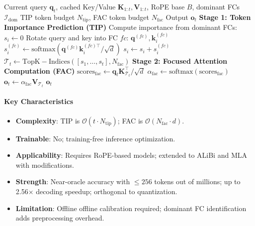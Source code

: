 \begin{algorithm}[H]
\caption{FASA: Frequency-Aware Sparse Attention (Inference-Time)}
\begin{algorithmic}[1]
\Require Current query $\mathbf{q}_t$, cached Key/Value $\mathbf{K}_{1:t}, \mathbf{V}_{1:t}$, RoPE base $B$, dominant FCs $\mathcal{I}_{\text{dom}}$
\Require TIP token budget $N_{\text{tip}}$, FAC token budget $N_{\text{fac}}$
\Ensure Output $\mathbf{o}_t$
\State \textbf{Stage 1: Token Importance Prediction (TIP)}
        \State Compute importance from dominant FCs: $s_i \gets 0$
            \State Rotate query and key into FC $fc$: $\mathbf{q}^{(fc)}, \mathbf{k}_i^{(fc)}$
            \State $s_i^{(fc)} \gets \text{softmax}(\mathbf{q}^{(fc)} \mathbf{k}_i^{(fc)\top} / \sqrt{d}) $
            \State $s_i \gets s_i + s_i^{(fc)}$
        \EndFor
    \EndFor
    \State $\mathcal{T}_t \gets \mathrm{TopK-Indices}([s_1, \ldots, s_t], N_{\text{fac}})$ 
\EndFor
\State \textbf{Stage 2: Focused Attention Computation (FAC)}
\State $\text{scores}_{\text{fac}} \gets \mathbf{q}_t \mathbf{K}_{\mathcal{T}_t}^\top / \sqrt{d}$ 
\State $\alpha_{\text{fac}} \gets \text{softmax}(\text{scores}_{\text{fac}})$ 
\State $\mathbf{o}_t \gets \alpha_{\text{fac}} \mathbf{V}_{\mathcal{T}_t}$ 
\Return $\mathbf{o}_t$
\end{algorithmic}
\end{algorithm}

\paragraph{Key Characteristics}

\begin{itemize}[leftmargin=*]
    \item \textbf{Complexity}: TIP is $\mathcal{O}(t \cdot N_{\text{tip}})$; FAC is $\mathcal{O}(N_{\text{fac}} \cdot d)$.
    \item \textbf{Trainable}: No; training-free inference optimization.
    \item \textbf{Applicability}: Requires RoPE-based models; extended to ALiBi and MLA with modifications.
    \item \textbf{Strength}: Near-oracle accuracy with $\leq 256$ tokens out of millions; up to 2.56$\times$ decoding speedup; orthogonal to quantization.
    \item \textbf{Limitation}: Offline offline calibration required; dominant FC identification adds preprocessing overhead.
\end{itemize}

